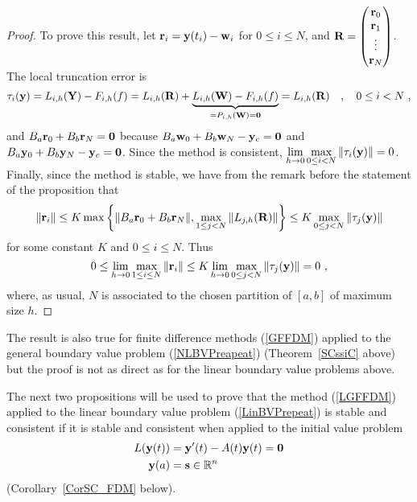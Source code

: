 \begin{proof}
To prove this result, 
let $\mathbf{r}_i = \mathbf{y}(t_i) - \mathbf{w}_i$ for $0\leq i \leq N$, and
$\displaystyle \mathbf{R} = \begin{pmatrix}
\mathbf{r}_0 \\ \mathbf{r}_1 \\ \vdots \\ \mathbf{r}_N \end{pmatrix}$.
The local truncation error is
\[
\mathbf{\tau}_i(\mathbf{y}) =
L_{i,h}(\mathbf{Y}) - F_{i,h}(f)
= L_{i,h}(\mathbf{R}) + \underbrace{L_{i,h}(\mathbf{W})
- F_{i,h}(f)}_{=P_{i,h}(\mathbf{W}) = \mathbf{0}}
= L_{i,h}(\mathbf{R}) \quad , \quad 0 \leq i < N \ ,
\]
and $B_a\mathbf{r}_0 + B_b\mathbf{r}_N = \mathbf{0}$ because
$B_a\mathbf{w}_0 + B_b\mathbf{w}_N -\mathbf{y}_c = \mathbf{0}$ and
$B_a\mathbf{y}_0 + B_b\mathbf{y}_N - \mathbf{y}_c = \mathbf{0}$.
Since the method is consistent,
$\displaystyle \lim_{h\to 0} \max_{0\leq i < N}\|\mathbf{\tau}_i(\mathbf{y}) \|= 0$.
Finally, since the method is stable, we have from the remark before
the statement of the proposition that
\[
\| \mathbf{r}_i \| \leq
K \max \left\{ \| B_a\mathbf{r}_0 +B_b\mathbf{r}_N \| ,
\max_{1\leq j < N} \| L_{j,h}(\mathbf{R}) \|
\right\}
\leq K \max_{0\leq j < N} \| \mathbf{\tau}_j(\mathbf{y}) \|
\]
for some constant $K$ and $0 \leq i \leq N$.
Thus
\[
0 \leq \lim_{h\to 0}  \max_{1\leq i \leq N} \| \mathbf{r}_i \| 
\leq K \lim_{h\to 0} \max_{0\leq j < N} \| \mathbf{\tau}_j(\mathbf{y}) \| = 0 \ ,
\]
where, as usual, $N$ is associated to the chosen partition of
$[a,b]$ of maximum size $h$.
\end{proof}

The result is also true for finite difference
methods (\ref{GFFDM}) applied to the general boundary value problem
(\ref{NLBVPreapeat}) (Theorem~\ref{SCssiC} above) but the proof is
not as direct as for the linear boundary value problems above.

The next two propositions will be used to prove that the method
(\ref{LGFFDM}) applied to the linear boundary value problem
(\ref{LinBVPrepeat}) is stable and consistent if it is stable and
consistent when applied to the initial value problem 
\begin{align*}
L(\mathbf{y}(t)) &= \mathbf{y}'(t) - A(t) \mathbf{y}(t) = \mathbf{0} \\
\mathbf{y}(a) &= \mathbf{s} \in \mathbb{R}^n
\end{align*}
(Corollary~\ref{CorSC_FDM} below).

